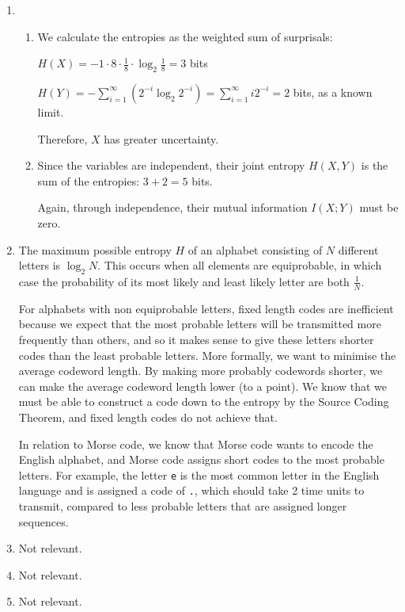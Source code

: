 


\begin{enumerate}[label=(\alph*)]
  \item
    \begin{enumerate}[label=(\roman*)]
      \item

        We calculate the entropies as the weighted sum of surprisals:

        $H(X) = -1 \cdot 8 \cdot \frac{1}{8} \cdot\log_2 \frac{1}{8} = 3$ bits

        $H(Y) = -\sum_{i=1}^\infty (2^{-i} \log_2 2^{-i}) = \sum_{i=1}^\infty i2^{-i} = 2$ bits, as a known limit.

        Therefore, $X$ has greater uncertainty.

      \item
        Since the variables are independent, their joint entropy $H(X,Y)$ is the sum of the entropies: $3 + 2 = 5$ bits.

        Again, through independence, their mutual information $I(X;Y)$ must be zero.

    \end{enumerate}


      \item
        The maximum possible entropy $H$ of an alphabet consisting of $N$ different letters is $\log_2 N$. This occurs when all elements are equiprobable, in which case the probability of its most likely and least likely letter are both $\frac{1}{N}$.

        For alphabets with non equiprobable letters, fixed length codes are inefficient because we expect that the most probable letters will be transmitted more frequently than others, and so it makes sense to give these letters shorter codes than the least probable letters. More formally, we want to minimise the average codeword length. By making more probably codewords shorter, we can make the average codeword length lower (to a point). We know that we must be able to construct a code down to the entropy by the Source Coding Theorem, and fixed length codes do not achieve that.

        In relation to Morse code, we know that Morse code wants to encode the English alphabet, and  Morse code assigns short codes to the most probable letters. For example, the letter \texttt{e} is the most common letter in the English language and is assigned a code of \texttt{.}, which should take 2 time units to transmit, compared to less probable letters that are assigned longer sequences.

      \item
        Not relevant.

      \item
        Not relevant.

      \item
        Not relevant.

        
\end{enumerate}

